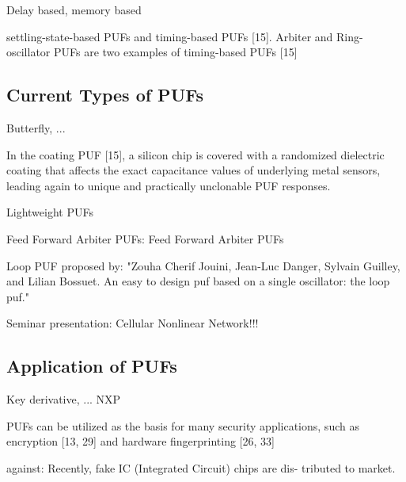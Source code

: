 Delay based, memory based 

settling-state-based PUFs and timing-based PUFs [15].
Arbiter and Ring-oscillator PUFs are two examples of timing-based PUFs [15]
\cite{Tajik2014PhysicalPUFs}

\cite{Becker2015ThePUFs}


\subsection{Current Types of PUFs}
\label{sec:typesofpufs}



Butterfly, ...
\cite{Becker2015ThePUFs}

In the coating PUF [15], a silicon chip is covered with a randomized dielectric coating that affects the exact capacitance values of underlying metal sensors, leading again to unique and practically unclonable PUF responses. \cite{Armknecht2011AFunctions}

Lightweight PUFs \cite{Delvaux2014SecureImpossible}

Feed Forward Arbiter PUFs: Feed Forward Arbiter PUFs \cite{Ruhrmair2013PUFData}

Loop PUF proposed by: "Zouha Cherif Jouini, Jean-Luc Danger, Sylvain Guilley, and Lilian
Bossuet. An easy to design puf based on a single oscillator: the loop
puf."

Seminar presentation:
Cellular Nonlinear Network!!!

\apufs





\subsection{Application of PUFs}

Key derivative, ...
\cite{Becker2015ThePUFs} NXP

PUFs can be utilized as the basis for many security applications, such as encryption [13, 29] and hardware fingerprinting [26, 33]
\cite{Tajik2014PhysicalPUFs}

against: Recently, fake IC (Integrated Circuit) chips are dis- tributed to market.
\cite{Machida2015ImplementationFPGA}


